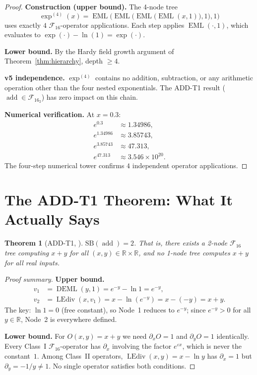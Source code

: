 \documentclass[12pt,a4paper]{article}
\newtheorem{theorem}{Theorem}[section]
\theoremstyle{definition}
\theoremstyle{remark}
\newcommand{\EML}{\operatorname{EML}}
\newcommand{\DEML}{\operatorname{DEML}}
\newcommand{\LEdiv}{\operatorname{LEdiv}}
\newcommand{\addop}{\operatorname{add}}
\newcommand{\F}{\mathcal{F}_{16}}
\newcommand{\SB}{\mathrm{SB}}
\newcommand{\R}{\mathbb{R}}
\begin{document}
\begin{proof}
\textbf{Construction (upper bound).}
The 4-node tree
\[
  \exp^{(4)}(x)
  = \EML\!\bigl(\EML\!\bigl(\EML\!\bigl(\EML(x,1)\bigr),1\bigr),1\bigr)
\]
uses exactly $4$ $\F$-operator applications.  Each step applies $\EML(\cdot,1)$,
which evaluates to $\exp(\cdot) - \ln(1) = \exp(\cdot)$.

\textbf{Lower bound.}
By the Hardy field growth argument of Theorem~\ref{thm:hierarchy}, depth $\geq 4$.

\textbf{v5 independence.}
$\exp^{(4)}$ contains no addition, subtraction, or any arithmetic operation
other than the four nested exponentials.  The ADD-T1 result ($\addop \in \F_2$)
has zero impact on this chain.

\textbf{Numerical verification.}  At $x = 0.3$:
\begin{align*}
  e^{0.3}      &\approx 1.34986, \\
  e^{1.34986}  &\approx 3.85743, \\
  e^{3.85743}  &\approx 47.313, \\
  e^{47.313}   &\approx 3.546 \times 10^{20}.
\end{align*}
The four-step numerical tower confirms $4$ independent operator applications.
\end{proof}

\section{The ADD-T1 Theorem: What It Actually Says}
\label{sec:addt1}

\begin{theorem}[ADD-T1, \cite{ADDT1}]
\label{thm:addt1}
$\SB(\addop) = 2$.  That is, there exists a 2-node $\F$ tree computing
$x + y$ for all $(x,y) \in \R \times \R$, and no 1-node tree computes
$x+y$ for all real inputs.
\end{theorem}

\begin{proof}[Proof summary]
\textbf{Upper bound.}
\begin{align*}
  v_1 &= \DEML(y, 1) = e^{-y} - \ln 1 = e^{-y}, \\
  v_2 &= \LEdiv(x, v_1) = x - \ln(e^{-y}) = x - (-y) = x + y.
\end{align*}
The key: $\ln 1 = 0$ (free constant), so Node~1 reduces to $e^{-y}$; since
$e^{-y} > 0$ for all $y\in\R$, Node~2 is everywhere defined.

\textbf{Lower bound.}
For $O(x,y) = x+y$ we need $\partial_x O = 1$ and $\partial_y O = 1$
identically.  Every Class~I $\F$-operator has $\partial_x$ involving the factor
$e^{\varepsilon x}$, which is never the constant~$1$.  Among Class~II operators,
$\LEdiv(x,y) = x - \ln y$ has $\partial_x = 1$ but $\partial_y = -1/y \neq 1$.
No single operator satisfies both conditions.
\end{proof}
\end{document}
